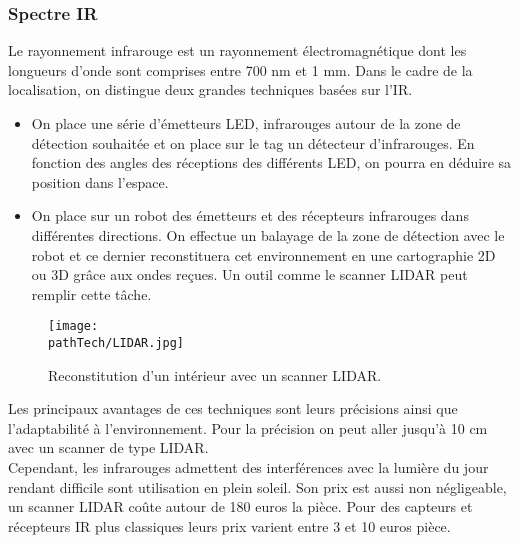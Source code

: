\subsubsection{Spectre IR}
Le rayonnement infrarouge est un rayonnement électromagnétique dont les longueurs d'onde sont comprises entre 700 nm et 1 mm. Dans le cadre de la localisation, on distingue deux grandes techniques basées sur l'IR.
\begin{itemize} 
\item On place une série d'émetteurs LED, infrarouges autour de la zone de détection souhaitée et on place sur le tag un détecteur d'infrarouges. En fonction des angles des réceptions des différents LED, on pourra en déduire sa position dans l'espace.
\item On place sur un robot des émetteurs et des récepteurs infrarouges dans différentes directions. On effectue un balayage de la zone de détection avec le robot et ce dernier reconstituera cet environnement en une cartographie 2D ou 3D grâce aux ondes reçues. Un outil comme le scanner LIDAR peut remplir cette tâche.
\end{itemize}
    \begin{figure}[H]
    \centering
    \texttt{[image: \\pathTech/LIDAR.jpg]}
    \caption{Reconstitution d'un intérieur avec un scanner LIDAR.}
\end{figure}
Les principaux avantages de ces techniques sont leurs précisions ainsi que l'adaptabilité à l'environnement. Pour la précision on peut aller jusqu'à 10 cm avec un scanner de type LIDAR.
\medskip
\\
Cependant, les infrarouges admettent des interférences avec la lumière du jour rendant difficile sont utilisation en plein soleil. Son prix est aussi non négligeable, un scanner LIDAR coûte autour de 180 euros la pièce. Pour des capteurs et récepteurs IR plus classiques leurs prix varient entre 3 et 10 euros pièce.